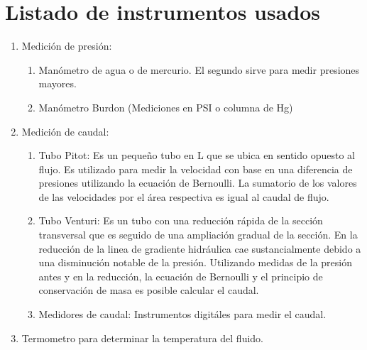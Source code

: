 \documentclass[10pt, a4paper]{exam}
\begin{document}
\section{Listado de instrumentos usados}
\begin{enumerate}
\item Medici\'on de presi\'on:
\begin{enumerate}
\item Man\'ometro de agua o de mercurio. El segundo sirve para medir presiones mayores.
\item Man\'ometro Burdon (Mediciones en PSI o columna de Hg)
\end{enumerate}
\item Medici\'on de caudal:
\begin{enumerate}
\item Tubo Pitot: Es un peque\~no tubo en L que se ubica en sentido opuesto al flujo. Es utilizado para medir la velocidad con base en una diferencia de presiones utilizando la ecuaci\'on de Bernoulli. La sumatorio de los valores de las velocidades por el \'area respectiva es igual al caudal de flujo. 
\item Tubo Venturi: Es un tubo con una reducci\'on r\'apida de la secci\'on transversal que es seguido de una ampliaci\'on gradual de la secci\'on. En la reducci\'on de la linea de gradiente hidr\'aulica cae sustancialmente debido a una disminuci\'on notable de la presi\'on. Utilizando medidas de la presi\'on antes y en la reducci\'on, la ecuaci\'on de Bernoulli y el principio de conservaci\'on de masa es posible calcular el caudal.
\item Medidores de caudal: Instrumentos digit\'ales para medir el caudal.
\end{enumerate}
\item Termometro para determinar la temperatura del fluido.
\end{enumerate}
\end{document}
